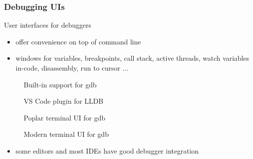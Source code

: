 \begin{frame}[fragile]
  \frametitle{Debugging UIs}
  \begin{block}{User interfaces for debuggers}
    \begin{itemize}
      \item offer convenience on top of command line
      \item windows for variables, breakpoints, call stack, active threads, watch variables in-code, disassembly, run to cursor ...
    \end{itemize}
    \begin{description}
      \item[\href{https://code.visualstudio.com/docs/cpp/cpp-debug}{}]
        Built-in support for gdb
      \item[\href{https://marketplace.visualstudio.com/items?itemName=vadimcn.vscode-lldb}{}]
        VS Code plugin for LLDB
      \item[\href{https://github.com/cyrus-and/gdb-dashboard}{}]
        Poplar terminal UI for gdb
      \item[\href{https://github.com/hugsy/gef}{}]
        Modern terminal UI for gdb
    \end{description}
    \begin{itemize}
      \item some editors and most IDEs have good debugger integration
    \end{itemize}
  \end{block}
\end{frame}

